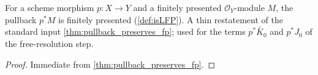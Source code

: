 \begin{lemma}
  \label{lem:pullback_isLFP}
  For a scheme morphism $p : X \to Y$ and a finitely presented $\mathcal{O}_Y$-module
  $M$, the pullback $p^* M$ is finitely presented (\cref{def:isLFP}). A thin
  restatement of the standard input \cref{thm:pullback_preserves_fp}; used for the
  terms $p^* \widetilde{K_0}$ and $p^* J_0$ of the free-resolution step.
  \begin{proof}
    Immediate from \cref{thm:pullback_preserves_fp}.
  \end{proof}
\end{lemma}


